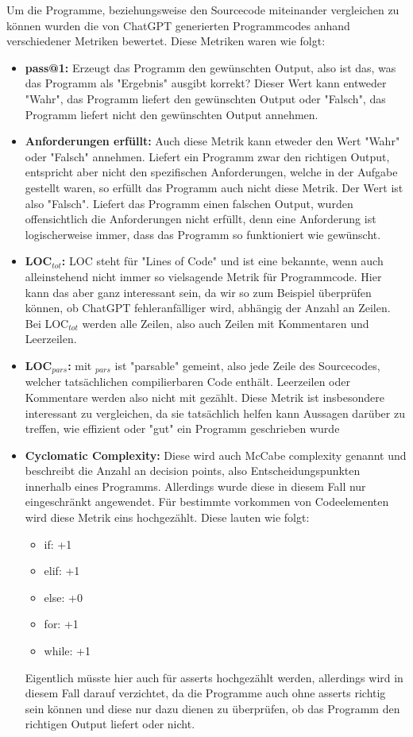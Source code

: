 \documentclass[class=scrbook, crop=false]{standalone}
\begin{document}
    Um die Programme, beziehungsweise den Sourcecode miteinander vergleichen zu können wurden die von ChatGPT generierten Programmcodes anhand verschiedener Metriken bewertet.
    Diese Metriken waren wie folgt:
    \begin{itemize}
    \item \textbf{pass@1:} Erzeugt das Programm den gewünschten Output, also ist das, was das Programm als "Ergebnis" ausgibt korrekt?
    Dieser Wert kann entweder "Wahr", das Programm liefert den gewünschten Output oder "Falsch", das Programm liefert nicht den gewünschten Output annehmen.
    \item \textbf{Anforderungen erfüllt:} Auch diese Metrik kann etweder den Wert "Wahr" oder "Falsch" annehmen.
    Liefert ein Programm zwar den richtigen Output, entspricht aber nicht den spezifischen Anforderungen, welche in der Aufgabe gestellt waren,
    so erfüllt das Programm auch nicht diese Metrik. Der Wert ist also "Falsch".
    Liefert das Programm einen falschen Output, wurden offensichtlich die Anforderungen nicht erfüllt,
    denn eine Anforderung ist logischerweise immer, dass das Programm so funktioniert wie gewünscht.
    \item \textbf{LOC$_{tot}$:} LOC steht für "Lines of Code" und ist eine bekannte, wenn auch alleinstehend nicht immer so vielsagende Metrik für Programmcode.
    Hier kann das aber ganz interessant sein, da wir so zum Beispiel überprüfen können, ob ChatGPT fehleranfälliger wird, abhängig der Anzahl an Zeilen.
    Bei LOC$_{tot}$ werden alle Zeilen, also auch Zeilen mit Kommentaren und Leerzeilen.
    \item \textbf{LOC$_{pars}$:} mit $_{pars}$ ist "parsable" gemeint, also jede Zeile des Sourcecodes, welcher tatsächlichen compilierbaren Code enthält.
    Leerzeilen oder Kommentare werden also nicht mit gezählt.
    Diese Metrik ist insbesondere interessant zu vergleichen, da sie tatsächlich helfen kann Aussagen darüber zu treffen, wie effizient oder "gut" ein Programm geschrieben wurde
    \item \textbf{Cyclomatic Complexity:} Diese wird auch McCabe complexity genannt und beschreibt die Anzahl an decision points,
    also Entscheidungspunkten innerhalb eines Programms.
    Allerdings wurde diese in diesem Fall nur eingeschränkt angewendet.
    Für bestimmte vorkommen von Codeelementen wird diese Metrik eins hochgezählt.
    Diese lauten wie folgt:
        \begin{itemize}
            \item if: +1
            \item elif: +1
            \item else: +0
            \item for: +1
            \item while: +1
        \end{itemize}
    Eigentlich müsste hier auch für asserts hochgezählt werden, allerdings wird in diesem Fall darauf verzichtet, da die
    Programme auch ohne asserts richtig sein können und diese nur dazu dienen zu überprüfen, ob das Programm den richtigen Output liefert oder nicht.
    \end{itemize}
\end{document}
